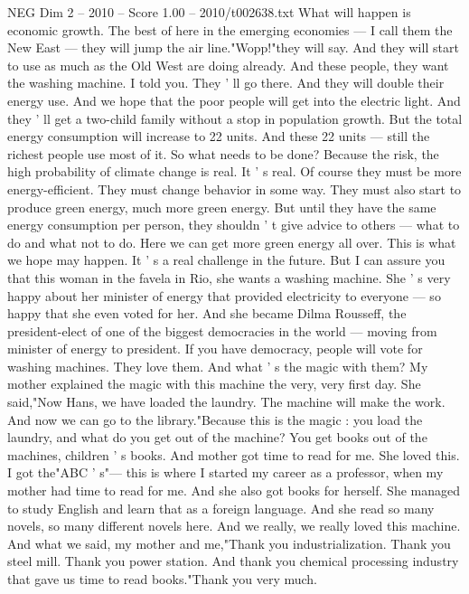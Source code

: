 \begin{textsample}{NEG Dim 2 – 2010 – Score 1.00 – 2010/t002638.txt}
What will happen is economic growth.
The best of here in the emerging economies — I call them the New East — they will jump the air line."Wopp!"they will say.
And they will start to use as much as the Old West are doing already.
And these people, they want the washing machine.
I told you.
They ' ll go there.
And they will double their energy use.
And we hope that the poor people will get into the electric light.
And they ' ll get a two-child family without a stop in population growth.
But the total energy consumption will increase to 22 units.
And these 22 units — still the richest people use most of it.
So what needs to be done?
Because the risk, the high probability of climate change is real.
It ' s real.
Of course they must be more energy-efficient.
They must change behavior in some way.
They must also start to produce green energy, much more green energy.
But until they have the same energy consumption per person, they shouldn ' t give advice to others — what to do and what not to do.
Here we can get more green energy all over.
This is what we hope may happen.
It ' s a real challenge in the future.
But I can assure you that this woman in the favela in Rio, she wants a washing machine.
She ' s very happy about her minister of energy that provided electricity to everyone — so happy that she even voted for her.
And she became Dilma Rousseff, the president-elect of one of the biggest democracies in the world — moving from minister of energy to president.
If you have democracy, people will vote for washing machines.
They love them.
And what ' s the magic with them?
My mother explained the magic with this machine the very, very first day.
She said,"Now Hans, we have loaded the laundry.
The machine will make the work.
And now we can go to the library."Because this is the magic : you load the laundry, and what do you get out of the machine?
You get books out of the machines, children ' s books.
And mother got time to read for me.
She loved this.
I got the"ABC ' s"— this is where I started my career as a professor, when my mother had time to read for me.
And she also got books for herself.
She managed to study English and learn that as a foreign language.
And she read so many novels, so many different novels here.
And we really, we really loved this machine.
And what we said, my mother and me,"Thank you industrialization.
Thank you steel mill.
Thank you power station.
And thank you chemical processing industry that gave us time to read books."Thank you very much.

\end{textsample}
